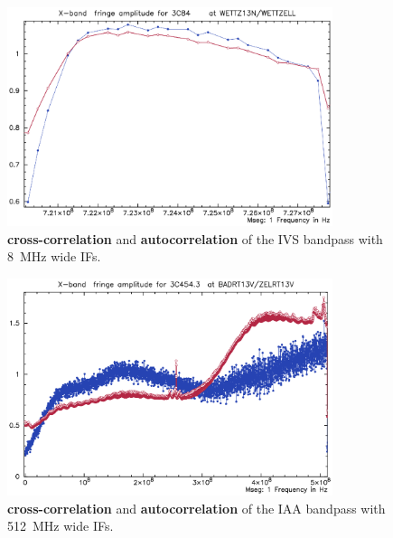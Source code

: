 \documentclass[11pt]{article}
\newcommand{\Rd}[1]{\textcolor{Dred}{\bf #1}}
\newcommand{\Bl}[1]{\textcolor{Dblue}{\bf #1}}
\begin{document}
\begin{figure}
   \centerline{\includegraphics[width=0.85\textwidth]{plots/ivs_bps.ps}}
   \caption{\Bl{cross-correlation} and \Rd{autocorrelation} of the IVS
             bandpass with 8~MHz wide IFs.}
   \label{f:ivs}
\end{figure}

\begin{figure}
   \centerline{\includegraphics[width=0.85\textwidth]{plots/iaa_bps.ps}}
   \caption{\Bl{cross-correlation} and \Rd{autocorrelation} of the IAA
             bandpass with 512~MHz wide IFs.}
   \label{f:iva}
\end{figure}
\end{document}
